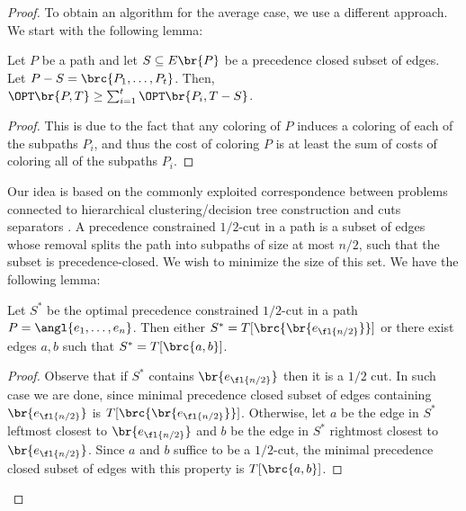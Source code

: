 \begin{proof}
    To obtain an algorithm for the average case, we use a different approach. We start with the following lemma:
    \begin{lemma}\label{ea:lemma:subinstances_avg}
    Let $P$ be a path and let $S\subseteq E\br{P}$ be a precedence closed subset of edges. Let $P-S=\brc{P_1,\dots,P_t}$. Then, $\OPT\br{P, T} \geq \sum_{i=1}^t \OPT\br{P_i, T-S}$.
\end{lemma}
\begin{proof}
    This is due to the fact that any coloring of $P$ induces a coloring of each of the subpaths $P_i$, and thus the cost of coloring $P$ is at least the sum of costs of coloring all of the subpaths $P_i$.
\end{proof}
    Our idea is based on the commonly exploited correspondence between problems connected to hierarchical clustering/decision tree construction and cuts separators \cite{ACostFunctionForSimilarityBasedHierarchicalClustering,ApproximateHierarchicalClusteringViaSparsestCutAndSpreadingMetrics,HierarchicalClusteringObjectiveFunctionsAndAlgorithms,ApproximatingTheAverageCaseGraphSearchProblemWithNonUniformCosts, FastApproximationOfSearchTreesOnTreesWithCentroidTrees, OnTheComplexityOfSearchingInTreesAverageCaseMinimization,ImprovedApproximationAlgorithmsForTheAverageCaseTreeSearchingProblem, TightApproximationBoundsOnASimpleAlgorithmForMinimumAverageSearchTimeInTrees}.
    A precedence constrained $1/2$-cut in a path is a subset of edges whose removal splits the path into subpaths of size at most $n/2$, such that the subset is precedence-closed. We wish to minimize the size of this set. We have the following lemma:
    \begin{lemma}\label{ea:lemma:optimal_half_cut}
    Let $S^*$ be the optimal precedence constrained $1/2$-cut in a path $P=\angl{e_1,\dots, e_n}$. Then either $S^* = T[\brc{\br{e_{\fl{n/2}}}}]$ or there exist edges $a, b$ such that $S^*=T[\brc{a, b}]$.
\end{lemma}
\begin{proof}
    Observe that if $S^*$ contains $\br{e_{\fl{n/2}}}$ then it is a $1/2$ cut. In such case we are done, since minimal precedence closed subset of edges containing $\br{e_{\fl{n/2}}}$ is $T[\brc{\br{e_{\fl{n/2}}}}]$. Otherwise, let $a$ be the edge in $S^*$ leftmost closest to $\br{e_{\fl{n/2}}}$ and $b$ be the edge in $S^*$ rightmost closest to $\br{e_{\fl{n/2}}}$. Since $a$ and $b$ suffice to be a $1/2$-cut, the minimal precedence closed subset of edges with this property is $T[\brc{a, b}]$.

\end{proof}
\end{proof}

